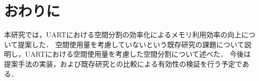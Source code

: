\chapter{おわりに}

本研究では，UARTにおける空間分割の効率化によるメモリ利用効率の向上について提案した．
空間使用量を考慮していないという既存研究の課題について説明し，UARTにおける空間使用量を考慮した空間分割について述べた．
今後は提案手法の実装，および既存研究との比較による有効性の検証を行う予定である．
